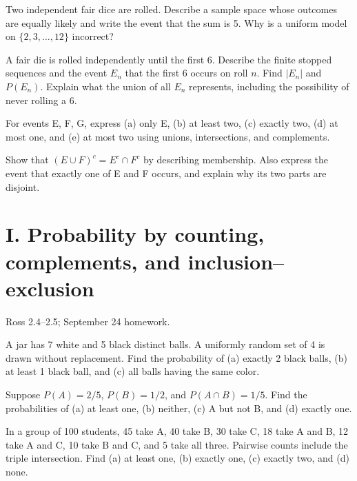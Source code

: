 \documentclass[11pt]{article}
\newcommand{\qid}[1]{\par\needspace{5\baselineskip}\noindent{\color{accent}\bfseries #1}\quad}
\newcommand{\source}[1]{{\small\color{muted}#1}\par}
\begin{document}
\qid{H2} Two independent fair dice are rolled. Describe a sample space whose outcomes are equally likely and write the event that the sum is 5. Why is a uniform model on \(\{2,3,\ldots,12\}\) incorrect?
\par\vspace{0.40in}

\qid{H3} A fair die is rolled independently until the first 6. Describe the finite stopped sequences and the event \(E_n\) that the first 6 occurs on roll \(n\). Find \(|E_n|\) and \(P(E_n)\). Explain what the union of all \(E_n\) represents, including the possibility of never rolling a 6.
\par\vspace{0.40in}

\qid{H4} For events E, F, G, express (a) only E, (b) at least two, (c) exactly two, (d) at most one, and (e) at most two using unions, intersections, and complements.
\par\vspace{0.40in}

\qid{H5} Show that \((E\cup F)^c=E^c\cap F^c\) by describing membership. Also express the event that exactly one of E and F occurs, and explain why its two parts are disjoint.
\par\vspace{0.40in}


\clearpage
\section*{I. Probability by counting, complements, and inclusion--exclusion}
\source{Ross 2.4--2.5; September 24 homework.}
\qid{I1} A jar has 7 white and 5 black distinct balls. A uniformly random set of 4 is drawn without replacement. Find the probability of (a) exactly 2 black balls, (b) at least 1 black ball, and (c) all balls having the same color.
\par\vspace{0.40in}

\qid{I2} Suppose \(P(A)=2/5\), \(P(B)=1/2\), and \(P(A\cap B)=1/5\). Find the probabilities of (a) at least one, (b) neither, (c) A but not B, and (d) exactly one.
\par\vspace{0.40in}

\qid{I3} In a group of 100 students, 45 take A, 40 take B, 30 take C, 18 take A and B, 12 take A and C, 10 take B and C, and 5 take all three. Pairwise counts include the triple intersection. Find (a) at least one, (b) exactly one, (c) exactly two, and (d) none.
\par\vspace{0.40in}
\end{document}
